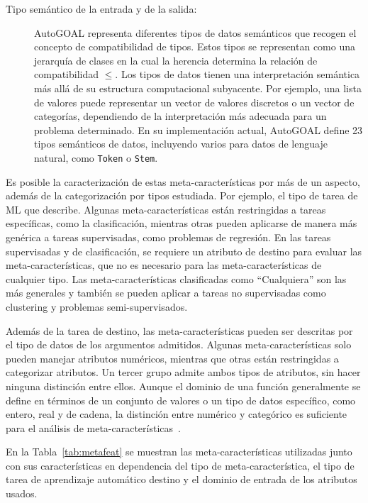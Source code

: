 \begin{itemize}
\begin{description}
		\item[Tipo semántico de la entrada y de la salida:] AutoGOAL representa diferentes tipos de datos semánticos que recogen el concepto de compatibilidad de tipos. Estos tipos se representan como una jerarquía de clases en la cual la herencia determina la relación de compatibilidad $\leq$. Los tipos de datos tienen una interpretación semántica más allá de su estructura computacional subyacente. Por ejemplo, una lista de valores puede representar un vector de valores discretos o un vector de categorías, dependiendo de la interpretación más adecuada para un problema determinado. En su implementación actual, AutoGOAL define 23 tipos semánticos de datos, incluyendo varios para datos de lenguaje natural, como \texttt{Token} o \texttt{Stem}.
	\end{description}
\end{itemize}

Es posible la caracterización de estas meta-características por más de un aspecto, además de la categorización por tipos estudiada. Por ejemplo, el tipo de tarea de ML que describe. Algunas meta-características están restringidas a tareas específicas, como la clasificación, mientras otras pueden aplicarse de manera más genérica a tareas supervisadas, como problemas de regresión. En las tareas supervisadas y de clasificación, se requiere un atributo de destino para evaluar las meta-características, que no es necesario para las meta-características de cualquier tipo. Las meta-características clasificadas como ``Cualquiera'' son las más generales y también se pueden aplicar a tareas no supervisadas como clustering y problemas semi-supervisados. 

Además de la tarea de destino, las meta-características pueden ser descritas por el tipo de datos de los argumentos admitidos. Algunas meta-características solo pueden manejar atributos numéricos, mientras que otras están restringidas a categorizar atributos. Un tercer grupo admite ambos tipos de atributos, sin hacer ninguna distinción entre ellos. Aunque el dominio de una función generalmente se define en términos de un conjunto de valores o un tipo de datos específico, como entero, real y de cadena, la distinción entre numérico y categórico es suficiente para el análisis de meta-características~\cite{Rivolli2018TowardsRE}.  

En la Tabla~\ref{tab:metafeat} se muestran las meta-características utilizadas junto con sus características en dependencia del tipo de meta-característica, el tipo de tarea de aprendizaje automático destino y el dominio de entrada de los atributos usados.

